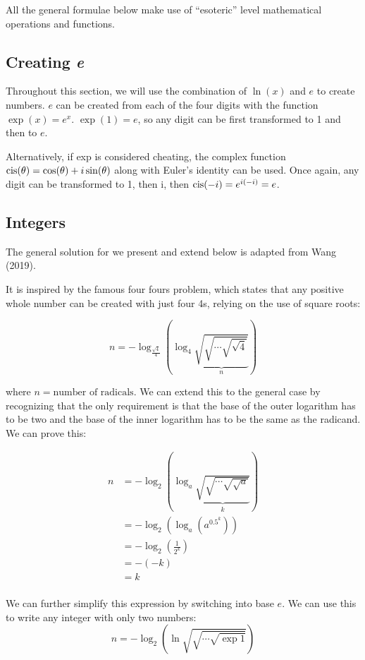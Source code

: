 All the general formulae below make use of ``esoteric'' level mathematical operations and functions.

\subsection{Creating \emph{e}}
Throughout this section, we will use the combination of $\ln(x)$ and $e$ to create numbers.
$e$ can be created from each of the four digits with the function $\exp(x)=e^x$.
$\exp(1)=e$, so any digit can be first transformed to 1 and then to $e$.

Alternatively, if exp is considered cheating, the complex function $\operatorname{cis}(\theta)=\cos(\theta)+i\sin(\theta)$ along with Euler's identity can be used. 
Once again, any digit can be transformed to 1, then i, then $\operatorname{cis}(-i)=e^{i(-i)}=e$.

\subsection{Integers}

The general solution for we present and extend below is adapted from Wang (2019).

It is inspired by the famous four fours problem, which states that any positive whole number can be created with just four 4s, relying on the use of square roots:

\begin{equation}
  n = -\log_\frac{\sqrt{4}}{4}\left( \log_4 \underbrace{\sqrt{\sqrt{\cdots\sqrt{\sqrt{4}}}}}_{n} \right)
\end{equation}

where $n=\textrm{number of radicals}$.
We can extend this to the general case by recognizing that the only requirement is that the base of the outer logarithm has to be two and the base of the inner logarithm has to be the same as the radicand.
We can prove this:

\begin{align*}
  n &= -\log_2\left(\log_a \underbrace{\sqrt{\sqrt{\cdots\sqrt{\sqrt{a}}}}}_{k} \right) \\
  &= -\log_2\left(\log_a \left(a^{0.5^k}\right)\right) \\
  &= -\log_2\left(\frac{1}{2^k}\right) \\
  &= -(-k) \\
  &= k \\
\end{align*}

We can further simplify this expression by switching into base $e$.
We can use this to write any integer with only two numbers:
\begin{equation}
  n = -\log_2\left( \ln \sqrt{\sqrt{\cdots\sqrt{\exp1}}}\right)
\end{equation}

